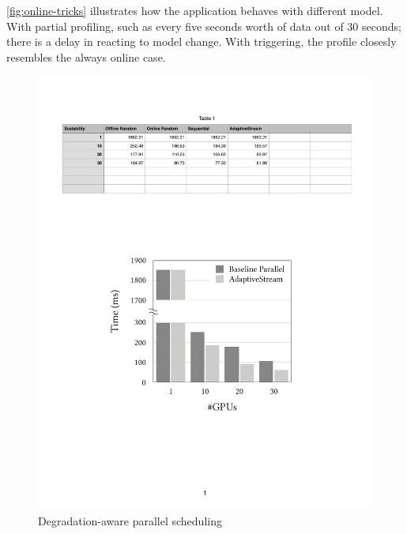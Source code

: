\autoref{fig:online-tricks} illustrates how the application behaves with
different model. With partial profiling, such as every five seconds worth of
data out of 30 seconds; there is a delay in reacting to model change. With
triggering, the profile closesly resembles the always online case.

\begin{figure}
  \centering
  \includegraphics[width=0.8\columnwidth]{figures/parallel.pdf}
  \caption{Degradation-aware parallel scheduling}
  \label{fig:parallel}
\end{figure}


\lipsum[1-2]

